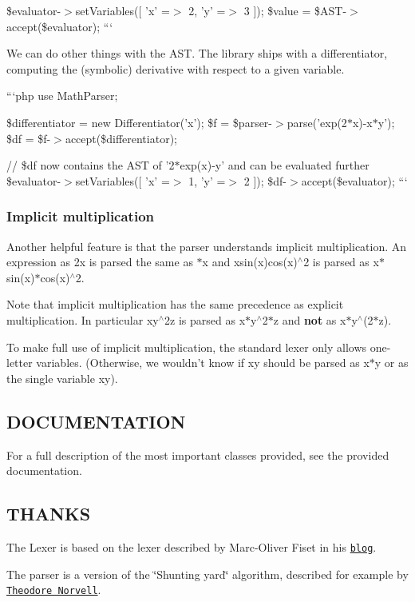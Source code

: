 \$evaluator-\/$>$set\-Variables(\mbox{[} 'x' =$>$ 2, 'y' =$>$ 3 \mbox{]}); \$value = \$\-A\-S\-T-\/$>$accept(\$evaluator); ```

We can do other things with the A\-S\-T. The library ships with a differentiator, computing the (symbolic) derivative with respect to a given variable.

```php use Math\-Parser;

\$differentiator = new Differentiator('x'); \$f = \$parser-\/$>$parse('exp(2$\ast$x)-\/x$\ast$y'); \$df = \$f-\/$>$accept(\$differentiator);

// \$df now contains the A\-S\-T of '2$\ast$exp(x)-\/y' and can be evaluated further \$evaluator-\/$>$set\-Variables(\mbox{[} 'x' =$>$ 1, 'y' =$>$ 2 \mbox{]}); \$df-\/$>$accept(\$evaluator); ```

\subsubsection*{Implicit multiplication}

Another helpful feature is that the parser understands implicit multiplication. An expression as {\ttfamily 2x} is parsed the same as {$\ast$x} and {\ttfamily xsin(x)cos(x)$^\wedge$2} is parsed as {\ttfamily x$\ast$sin(x)$\ast$cos(x)$^\wedge$2}.

Note that implicit multiplication has the same precedence as explicit multiplication. In particular {\ttfamily xy$^\wedge$2z} is parsed as {\ttfamily x$\ast$y$^\wedge$2$\ast$z} and {\bfseries not} as {\ttfamily x$\ast$y$^\wedge$(2$\ast$z)}.

To make full use of implicit multiplication, the standard lexer only allows one-\/letter variables. (Otherwise, we wouldn't know if {\ttfamily xy} should be parsed as {\ttfamily x$\ast$y} or as the single variable {\ttfamily xy}).

\subsection*{D\-O\-C\-U\-M\-E\-N\-T\-A\-T\-I\-O\-N }

For a full description of the most important classes provided, see the provided documentation.

\subsection*{T\-H\-A\-N\-K\-S }

The Lexer is based on the lexer described by Marc-\/\-Oliver Fiset in his \href{http://marcofiset.com/programming-language-implementation-part-1-lexer/}{\tt blog}.

The parser is a version of the \char`\"{}\-Shunting yard\char`\"{} algorithm, described for example by \href{http://www.engr.mun.ca/~theo/Misc/exp_parsing.htm#shunting_yard}{\tt Theodore Norvell}. 